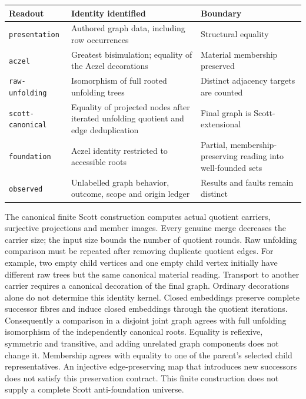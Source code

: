 \documentclass[11pt]{article}
\begin{document}
\begin{center}
\begin{tabular}{@{}>{\raggedright\arraybackslash}p{31mm}
                  >{\raggedright\arraybackslash}p{72mm}
                  >{\raggedright\arraybackslash}p{43mm}@{}}
\toprule
Readout & Identity identified & Boundary \\
\midrule
\texttt{presentation} & Authored graph data, including row occurrences & Structural equality \\
\texttt{aczel} & Greatest bisimulation; equality of the Aczel decorations & Material membership preserved \\
\texttt{raw-unfolding} & Isomorphism of full rooted unfolding trees & Distinct adjacency targets are counted \\
\texttt{scott-canonical} & Equality of projected nodes after iterated unfolding quotient and edge deduplication & Final graph is Scott-extensional \\
\texttt{foundation} & Aczel identity restricted to accessible roots & Partial, membership-preserving reading into well-founded sets \\
\texttt{observed} & Unlabelled graph behavior, outcome, scope and origin ledger & Results and faults remain distinct \\
\bottomrule
\end{tabular}
\end{center}

The canonical finite Scott construction computes actual quotient carriers,
surjective projections and member images. Every genuine merge decreases the
carrier size; the input size bounds the number of quotient rounds. Raw
unfolding comparison must be repeated after removing duplicate quotient
edges. For example, two empty child vertices and one empty child vertex
initially have different raw trees but the same canonical material reading.
Transport to another carrier requires a canonical decoration of the final
graph. Ordinary decorations alone do not determine this identity kernel.
Closed embeddings preserve complete successor fibres and induce closed
embeddings through the quotient iterations. Consequently a comparison in
a disjoint joint graph agrees with full unfolding isomorphism of the
independently canonical roots. Equality is reflexive, symmetric and
transitive, and adding unrelated graph components does not change it.
Membership agrees with equality to one of the parent's selected child
representatives. An injective edge-preserving map that introduces new
successors does not satisfy this preservation contract.
This finite construction does not supply a complete Scott anti-foundation
universe.
\end{document}
